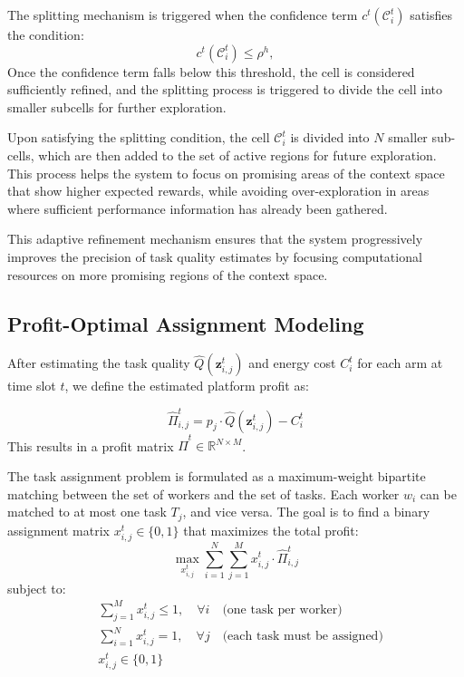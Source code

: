 The splitting mechanism is triggered when the confidence term \( c^t(\mathcal{C}_i^t) \) satisfies the condition:
\[
c^t(\mathcal{C}_i^t) \leq \rho^h,
\]
Once the confidence term falls below this threshold, the cell is considered sufficiently refined, and the splitting process is triggered to divide the cell into smaller subcells for further exploration.

Upon satisfying the splitting condition, the cell \( \mathcal{C}_i^t \) is divided into \( N \) smaller sub-cells, which are then added to the set of active regions for future exploration. This process helps the system to focus on promising areas of the context space that show higher expected rewards, while avoiding over-exploration in areas where sufficient performance information has already been gathered. 

This adaptive refinement mechanism ensures that the system progressively improves the precision of task quality estimates by focusing computational resources on more promising regions of the context space.


\subsection{Profit-Optimal Assignment Modeling}

After estimating the task quality \( \hat{Q}(\mathbf{z}_{i,j}^t) \) and energy cost \( C_i^t \) for each arm at time slot \( t \), we define the estimated platform profit as:

\[
\hat{\Pi}_{i,j}^t = p_j \cdot \hat{Q}(\mathbf{z}_{i,j}^t) - C_i^t
\]
This results in a profit matrix $\hat{\Pi}^t \in \mathbb{R}^{N \times M}$.

The task assignment problem is formulated as a maximum-weight bipartite matching between the set of workers and the set of tasks. Each worker $w_i$ can be matched to at most one task $T_j$, and vice versa. The goal is to find a binary assignment matrix $x_{i,j}^t \in \{0, 1\}$ that maximizes the total profit:
\[
\max_{x_{i,j}^t} \sum_{i=1}^N \sum_{j=1}^M x_{i,j}^t \cdot \hat{\Pi}_{i,j}^t
\]
subject to:
\begin{align*}
& \sum_{j=1}^M x_{i,j}^t \leq 1, \quad \forall i \quad \text{(one task per worker)} \\
& \sum_{i=1}^N x_{i,j}^t = 1, \quad \forall j \quad \text{(each task must be assigned)} \\
& x_{i,j}^t \in \{0,1\}
\end{align*}

